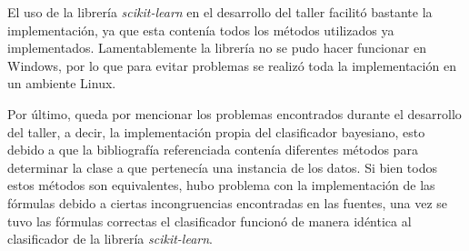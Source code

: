 \documentclass[letter, titlepage, 10pt]{article}
\begin{document}
El uso de la librería \textit{scikit-learn} en el desarrollo del taller facilitó bastante la implementación, ya que esta contenía todos los métodos utilizados ya implementados. Lamentablemente la librería no se pudo hacer funcionar en Windows, por lo que para evitar problemas se realizó toda la implementación en un ambiente Linux.

Por último, queda por mencionar los problemas encontrados durante el desarrollo del taller, a decir, la implementación propia del clasificador bayesiano, esto debido a que la bibliografía referenciada contenía diferentes métodos para determinar la clase a que pertenecía una instancia de los datos. Si bien todos estos métodos son equivalentes, hubo problema con la implementación de las fórmulas debido a ciertas incongruencias encontradas en las fuentes, una vez se tuvo las fórmulas correctas el clasificador funcionó de manera idéntica al clasificador de la librería \textit{scikit-learn}.


\newpage


\end{document}
